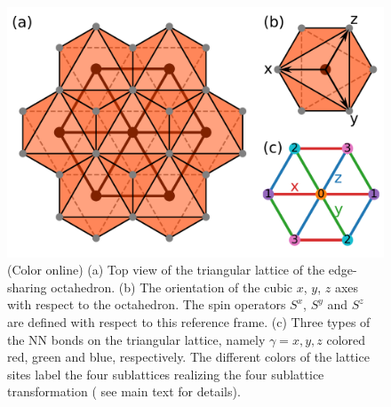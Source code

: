 \documentclass[aps,prb,reprint,amsfonts,amsmath,amssymb,showpacs,groupedaddress,superscriptaddress]{revtex4-1}
\begin{document}
\begin{figure}
    \centering
    \includegraphics[width=\columnwidth]{ModelDefinition.pdf}
    \caption{\label{fig:ModelDefinition}(Color online) (a) Top view of the triangular lattice of the edge-sharing octahedron. (b) The orientation of the cubic $x$, $y$, $z$ axes with respect to the octahedron. The spin operators $S^x$, $S^y$ and $S^z$ are defined with respect to this reference frame. (c) Three types of the NN bonds on the triangular lattice, namely $\gamma=x, y, z$ colored red, green and blue, respectively. The different colors of the lattice sites label the four sublattices realizing the four sublattice transformation ( see main text for details).}
\end{figure}
\end{document}

